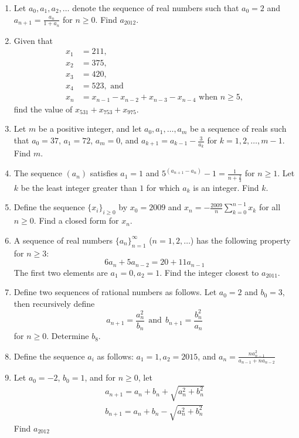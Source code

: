 \documentclass[11pt]{article}
\theoremstyle{theorem}
\theoremstyle{definition}
\theoremstyle{remark}
\theoremstyle{definition}
\theoremstyle{remark}
\begin{document}
\begin{enumerate}
\item Let $a_0, a_1, a_2, \ldots$ denote the sequence of real numbers such that $a_0 = 2$ and $a_{n+1}=\frac{a_n}{1+a_n}$ for $n \ge 0$. Find $a_{2012}$. %
\item Given that
\begin{align*}
x_{1}&=211,\\ 
x_{2}&=375,\\ 
x_{3}&=420,\\ 
x_{4}&=523, \text{ and}\\ 
x_{n}&=x_{n-1}-x_{n-2}+x_{n-3}-x_{n-4} \text{ when } n \geq 5, 
\end{align*}
find the value of $x_{531}+x_{753}+x_{975}$. %
\item Let $m$ be a positive integer, and let $a_0, a_1,\ldots,a_m$ be a sequence of reals such that $a_0=37$, $a_1=72$, $a_m=0$, and $a_{k+1}=a_{k-1}-\frac{3}{a_k}$ for $k=1,2, \dots, m-1$. Find $m$. %
\item The sequence $ (a_n)$ satisfies $ a_1 = 1$ and $ \displaystyle 5^{(a_{n+1}-a_n)} - 1 = \frac{1}{n+\frac{2}{3}}$ for $ n \geq 1$. Let $ k$ be the least integer greater than $ 1$ for which $ a_k$ is an integer. Find $k$. %
\item Define the sequence $\{x_i\}_{i \ge 0}$ by $x_{0}=2009$ and $x_n = -\frac{2009}{n}\sum_{k = 0}^{n-1} x_{k}$ for all $n \ge 0$. Find a closed form for $x_n$. %
\item A sequence of real numbers $\{a_n\}_{n=1}^{\infty}$ ($n = 1,2,\ldots$) has the following property for $n \ge 3$:
\[6a_n + 5a_{n-2} = 20 + 11a_{n-1}\] 
The first two elements are $a_1=0, a_2 = 1$. Find the integer closest to $a_{2011}$.%
\item Define two sequences of rational numbers as follows. Let $a_0=2$ and $b_0=3$, then recursively define
\[a_{n+1} = \frac{a_n^2}{b_n} \ \  \text{and} \ \ b_{n+1} = \frac{b_n^2}{a_n} \] for $n \ge 0$. Determine $b_8$. %
\item Define the sequence $a_i$ as follows: $a_1=1, a_2 = 2015$, and $a_n=\frac{na_{n-1}^2}{a_{n-1}+na_{n-2}}$ %
\item Let $a_0=-2$, $b_0=1$, and for $n\ge 0$, let
\begin{align*}
a_{n+1}=a_n+b_n+\sqrt{a_n^2+b_n^2}\\
b_{n+1}=a_n+b_n-\sqrt{a_n^2+b_n^2}
\end{align*}
Find $a_{2012}$ %

\end{enumerate}
\end{document}
